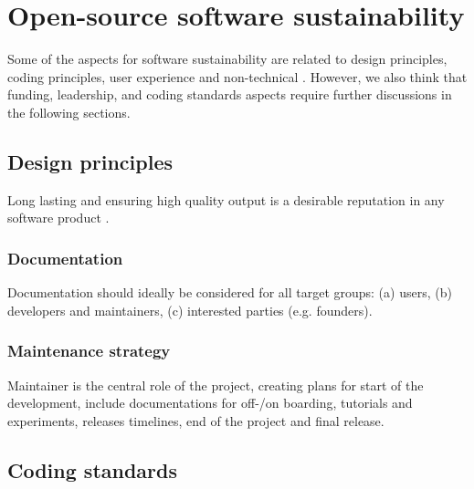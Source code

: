 \documentclass{article}
\begin{document}
\section{Open-source software sustainability}
Some of the aspects for software sustainability are related to design principles, coding principles, user experience and non-technical \cite{imran2019software}. However, we also think that funding, leadership, and coding standards aspects require further discussions in the following sections.

\subsection{Design principles}
Long lasting and ensuring high quality output is a desirable reputation in any software product \cite{imran2019software}. 

\subsubsection{Documentation}
Documentation should ideally be considered for all target groups: (a) users, (b) developers and maintainers, (c) interested parties (e.g. founders). 

\subsubsection{Maintenance strategy}
Maintainer is the central role of the project, creating plans for start of the development, include documentations for off-/on boarding, tutorials and experiments, releases timelines, end of the project and final release. \cite{druskat_2022_7034163}



\subsection{Coding standards}
\end{document}
